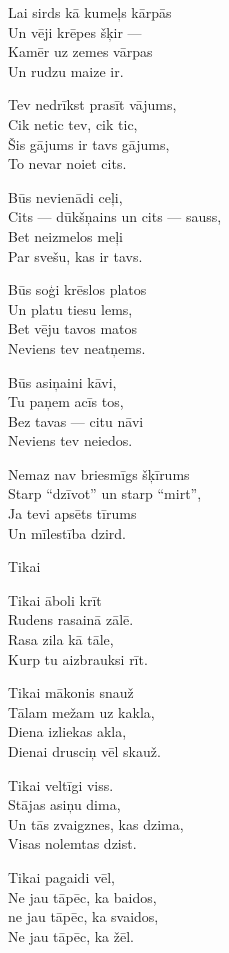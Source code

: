 \documentclass[14pt]{extarticle}
\begin{document}
Lai sirds kā kumeļs kārpās\\
Un vēji krēpes šķir ---\\
Kamēr uz zemes vārpas\\
Un rudzu maize ir.

Tev nedrīkst prasīt vājums,\\
Cik netic tev, cik tic,\\
Šis gājums ir tavs gājums,\\
To nevar noiet cits.

Būs nevienādi ceļi,\\
Cits --- dūkšņains un cits --- sauss,\\
Bet neizmelos meļi\\
Par svešu, kas ir tavs.

Būs soģi krēslos platos\\
Un platu tiesu lems,\\
Bet vēju tavos matos\\
Neviens tev neatņems.

Būs asiņaini kāvi,\\
Tu paņem acīs tos,\\
Bez tavas --- citu nāvi\\
Neviens tev neiedos.

Nemaz nav briesmīgs šķīrums\\
Starp ``dzīvot'' un starp ``mirt'',\\
Ja tevi apsēts tīrums\\
Un mīlestība dzird.


\newpage

{\large \sc Tikai}

Tikai āboli krīt\\
Rudens rasainā zālē.\\
Rasa zila kā tāle,\\
Kurp tu aizbrauksi rīt.

Tikai mākonis snauž\\
Tālam mežam uz kakla,\\
Diena izliekas akla,\\
Dienai drusciņ vēl skauž.

Tikai veltīgi viss.\\
Stājas asiņu dima,\\
Un tās zvaigznes, kas dzima,\\
Visas nolemtas dzist.

Tikai pagaidi vēl,\\
Ne jau tāpēc, ka baidos,\\
ne jau tāpēc, ka svaidos,\\
Ne jau tāpēc, ka žēl.
\end{document}
